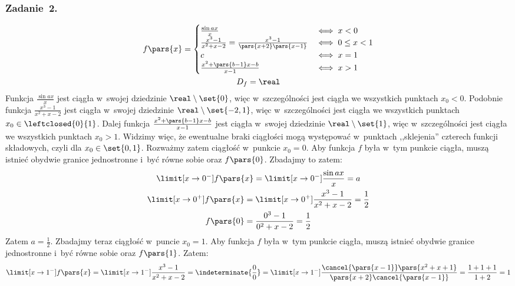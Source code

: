 \subsubsection*{Zadanie~2.}
\begin{gather*}
    f\pars{x} = \begin{cases}
        \frac{\sin ax}{x} & \iff x < 0\\
        \frac{x^3 - 1}{x^2 + x - 2} = \frac{x^3 - 1}{\pars{x + 2}\pars{x - 1}} & \iff 0 \leq x < 1\\
        c & \iff x = 1\\
        \frac{x^2 + \pars{b - 1}x - b}{x - 1} & \iff x > 1
    \end{cases}\\
    D_f = \real
\end{gather*}
Funkcja \(\frac{\sin ax}{x}\) jest ciągła w~swojej dziedzinie \(\real \setminus \set{0}\), więc w~szczególności jest ciągła we wszystkich punktach \(x_0 < 0\). Podobnie funkcja \(\frac{x^3 - 1}{x^2 + x - 2}\) jest ciągła w~swojej dziedzinie \(\real \setminus \set{-2, 1}\), więc w~szczególności jest ciągła we wszystkich punktach \(x_0 \in \leftclosed{0}{1}\). Dalej funkcja \(\frac{x^2 + \pars{b - 1}x - b}{x - 1}\) jest ciągła w~swojej dziedzinie \(\real \setminus \set{1}\), więc w~szczególności jest ciągła we wszystkich punktach \(x_0 > 1\). Widzimy więc, że ewentualne braki ciągłości mogą występować w~punktach ,,sklejenia'' czterech funkcji składowych, czyli dla \(x_0 \in \set{0, 1}\). Rozważmy zatem ciągłość w~punkcie \(x_0 = 0\). Aby funkcja \(f\) była w~tym punkcie ciągła, muszą istnieć obydwie granice jednostronne i~być równe sobie oraz \(f\pars{0}\). Zbadajmy to zatem:
\begin{gather*}
    \limit[x \to 0^-] f\pars{x}
        = \limit[x \to 0^-] \frac{\sin ax}{x}
        = a\\
    \limit[x \to 0^+] f\pars{x}
        = \limit[x \to 0^+] \frac{x^3 - 1}{x^2 + x - 2}
        = \frac{1}{2}\\
    f\pars{0}
        = \frac{0^3 - 1}{0^2 + x - 2}
        = \frac{1}{2}
\end{gather*}
Zatem \(a = \frac{1}{2}\). Zbadajmy teraz ciągłość w~puncie \(x_0 = 1\). Aby funkcja \(f\) była w~tym punkcie ciągła, muszą istnieć obydwie granice jednostronne i~być równe sobie oraz \(f\pars{1}\). Zatem:
\begin{gather*}
    \limit[x \to 1^-] f\pars{x}
        = \limit[x \to 1^-] \frac{x^3 - 1}{x^2 + x - 2}
        = \indeterminate{\frac{0}{0}}
        = \limit[x \to 1^-] \frac{\cancel{\pars{x - 1}}\pars{x^2 + x + 1}}{\pars{x + 2}\cancel{\pars{x - 1}}}
        = \frac{1 + 1 + 1}{1 + 2}
        = 1
\end{gather*}
